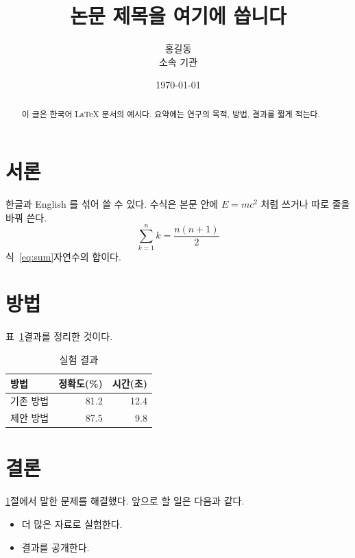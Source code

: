 \documentclass[11pt,a4paper]{article}
\title{논문 제목을 여기에 씁니다}
\author{홍길동\\ 소속 기관}
\date{\today}
\begin{document}
\maketitle

\begin{abstract}
이 글은 한국어 LaTeX 문서의 예시다. 요약에는 연구의 목적, 방법, 결과를 짧게 적는다.
\end{abstract}

\section{서론}\label{sec:intro}
한글과 English 를 섞어 쓸 수 있다. 수식은 본문 안에 $E = mc^2$ 처럼 쓰거나 따로 줄을 바꿔 쓴다.
\begin{equation}\label{eq:sum}
  \sum_{k=1}^{n} k = \frac{n(n+1)}{2}
\end{equation}
식~\eqref{eq:sum}\은 자연수의 합이다.

\section{방법}
표~\ref{tab:result}\는 결과를 정리한 것이다.
\begin{table}[h]
  \centering
  \caption{실험 결과}\label{tab:result}
  \begin{tabular}{lrr}
    \toprule
    방법 & 정확도(\%) & 시간(초) \\
    \midrule
    기존 방법 & 81.2 & 12.4 \\
    제안 방법 & 87.5 & 9.8 \\
    \bottomrule
  \end{tabular}
\end{table}

\section{결론}
\ref{sec:intro}절에서 말한 문제를 해결했다. 앞으로 할 일은 다음과 같다.
\begin{itemize}
  \item 더 많은 자료로 실험한다.
  \item 결과를 공개한다.
\end{itemize}
\end{document}
